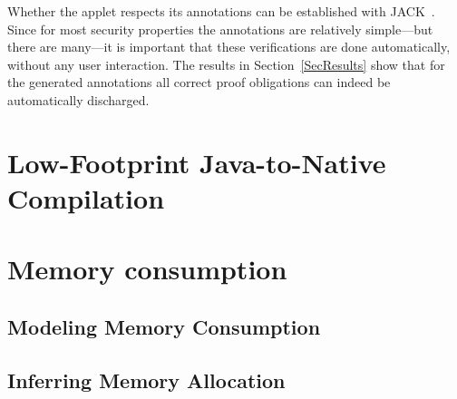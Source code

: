Whether the applet respects its annotations can be established with
JACK~\cite{BRL-JACK}.
Since
for most security properties the annotations are relatively
simple---but there are many---it is important that these verifications
are done automatically, without any user interaction. The results in
Section~\ref{SecResults} show that for the generated annotations all
correct proof obligations can indeed be automatically discharged.

\section{Low-Footprint Java-to-Native Compilation}

\section{Memory consumption}

\subsection{Modeling Memory Consumption}\label{sec:verif}

\subsection{Inferring Memory Allocation}\label{sec:infer}


